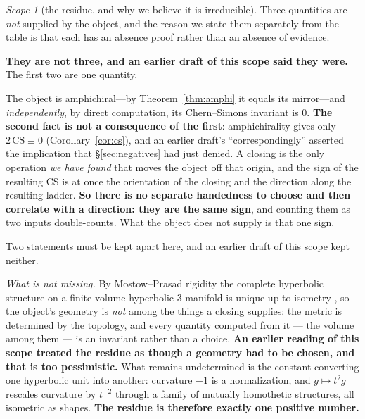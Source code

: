 \documentclass[11pt,reqno]{amsart}
\theoremstyle{plain}
\theoremstyle{definition}
\theoremstyle{remark}
\newtheorem{scope}[theorem]{Scope}
\begin{document}
\begin{scope}[the residue, and why we believe it is irreducible]\label{sc:residue}
Three quantities are \emph{not} supplied by the object, and the reason we state them
separately from the table is that each has an absence proof rather than an absence of
evidence.

\textbf{They are not three, and an earlier draft of this scope said they were.} The
first two are one quantity.

\begin{description}[leftmargin=1.9em,style=nextline,itemsep=2pt]
\item[\textnormal{\textbf{One sign, which is simultaneously an arrow and a hand.}}]
  The object is amphichiral---by Theorem~\ref{thm:amphi} it equals its
  mirror---and \emph{independently}, by direct computation, its Chern--Simons invariant
  is $0$. \textbf{The second fact is not a consequence of the first}: amphichirality
  gives only $2\,\mathrm{CS}\equiv0$ (Corollary~\ref{cor:cs}), and an earlier draft's
  ``correspondingly'' asserted the implication that \S\ref{sec:negatives} had just
  denied. A closing is the only operation \emph{we have found} that moves the object off
  that origin, and the sign of the
  resulting $\mathrm{CS}$ is at once the orientation of the closing and the direction
  along the resulting ladder. \textbf{So there is no separate handedness to choose and
  then correlate with a direction: they are the same sign}, and counting them as two
  inputs double-counts. What the object does not supply is that one sign.
\item[\textnormal{\textbf{One scale---and by rigidity it is a unit, not a geometry.}}]
  Two statements must be kept apart here, and an earlier draft of this scope kept neither.

  \emph{What is not missing.} By Mostow--Prasad rigidity the complete hyperbolic structure
  on a finite-volume hyperbolic $3$-manifold is unique up to isometry
  \cite{Mostow,Prasad}, so the object's geometry is \emph{not} among the things a closing
  supplies: the metric is determined by the topology, and every quantity computed from it
  --- the volume among them --- is an invariant rather than a choice.
  \textbf{An earlier reading of this scope treated the residue as though a geometry had to
  be chosen, and that is too pessimistic.} What remains undetermined is the constant
  converting one hyperbolic unit into another: curvature $-1$ is a normalization, and
  $g\mapsto t^{2}g$ rescales curvature by $t^{-2}$ through a family of mutually homothetic
  structures, all isometric as shapes. \textbf{The residue is therefore exactly one
  positive number.}


\end{description}
\end{scope}
\end{document}
